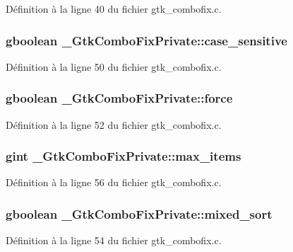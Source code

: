 Définition à la ligne 40 du fichier gtk\_\-combofix.c.

\subsubsection[{case\_\-sensitive}]{\setlength{\rightskip}{0pt plus 5cm}gboolean {\bf \_\-GtkComboFixPrivate::case\_\-sensitive}}\label{struct__GtkComboFixPrivate_af9915333cb1f06635c6d10707d5ded24}


Définition à la ligne 50 du fichier gtk\_\-combofix.c.

\subsubsection[{force}]{\setlength{\rightskip}{0pt plus 5cm}gboolean {\bf \_\-GtkComboFixPrivate::force}}\label{struct__GtkComboFixPrivate_a3160c38988047eefd963cd6b1ca0f6a4}


Définition à la ligne 52 du fichier gtk\_\-combofix.c.

\subsubsection[{max\_\-items}]{\setlength{\rightskip}{0pt plus 5cm}gint {\bf \_\-GtkComboFixPrivate::max\_\-items}}\label{struct__GtkComboFixPrivate_ac6f5addda5aeec8b2eba4a03c7732871}


Définition à la ligne 56 du fichier gtk\_\-combofix.c.

\subsubsection[{mixed\_\-sort}]{\setlength{\rightskip}{0pt plus 5cm}gboolean {\bf \_\-GtkComboFixPrivate::mixed\_\-sort}}\label{struct__GtkComboFixPrivate_a3d8e8cdfb65c1498160175e6c4f5c39f}


Définition à la ligne 54 du fichier gtk\_\-combofix.c.

